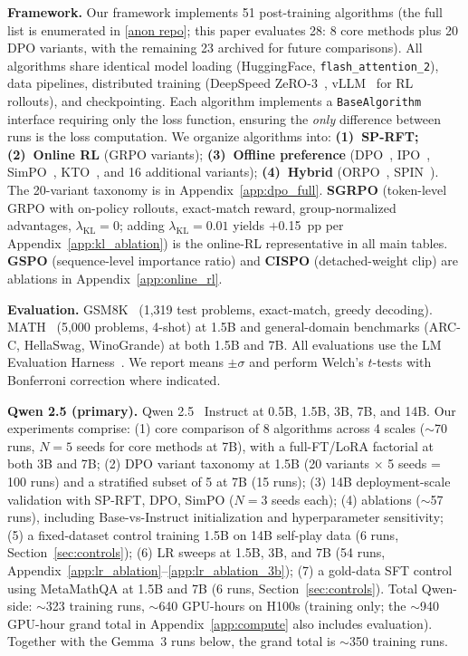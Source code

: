 \documentclass{article}
\newcommand{\sprft}{SP-RFT}
\begin{document}
\textbf{Framework.} Our framework implements 51 post-training algorithms (the full list is enumerated in [\href{https://github.com/anonymous/oxrl}{anon repo}]; this paper evaluates 28: 8 core methods plus 20 DPO variants, with the remaining 23 archived for future comparisons). All algorithms share identical model loading (HuggingFace, \texttt{flash\_attention\_2}), data pipelines, distributed training (DeepSpeed ZeRO-3~\citep{rajbhandari2020zero}, vLLM~\citep{kwon2023efficient} for RL rollouts), and checkpointing. Each algorithm implements a \texttt{BaseAlgorithm} interface requiring only the loss function, ensuring the \emph{only} difference between runs is the loss computation. We organize algorithms into: \textbf{(1)~\sprft{};} \textbf{(2)~Online RL} (GRPO variants); \textbf{(3)~Offline preference} (DPO~\citep{rafailov2023direct}, IPO~\citep{azar2024general}, SimPO~\citep{meng2024simpo}, KTO~\citep{ethayarajh2024kto}, and 16 additional variants); \textbf{(4)~Hybrid} (ORPO~\citep{hong2024orpo}, SPIN~\citep{chen2024spin}). The 20-variant taxonomy is in Appendix~\ref{app:dpo_full}. \textbf{SGRPO} (token-level GRPO with on-policy rollouts, exact-match reward, group-normalized advantages, $\lambda_\mathrm{KL}{=}0$; adding $\lambda_\mathrm{KL}{=}0.01$ yields $+$0.15~pp per Appendix~\ref{app:kl_ablation}) is the online-RL representative in all main tables. \textbf{GSPO} (sequence-level importance ratio) and \textbf{CISPO} (detached-weight clip) are ablations in Appendix~\ref{app:online_rl}.

\textbf{Evaluation.} GSM8K~\citep{cobbe2021gsm8k} (1,319 test problems, exact-match, greedy decoding). MATH~\citep{hendrycks2021math} (5,000 problems, 4-shot) at 1.5B and general-domain benchmarks (ARC-C, HellaSwag, WinoGrande) at both 1.5B and 7B. All evaluations use the LM Evaluation Harness~\citep{eval-harness}. We report means $\pm \sigma$ and perform Welch's $t$-tests with Bonferroni correction where indicated.

\label{sec:eval_protocol}
\label{sec:setup}

\textbf{Qwen 2.5 (primary).} Qwen 2.5~\citep{qwen2025qwen25} Instruct at 0.5B, 1.5B, 3B, 7B, and 14B. Our experiments comprise: (1) core comparison of 8 algorithms across 4 scales ($\sim$70 runs, $N{=}5$ seeds for core methods at 7B), with a full-FT/LoRA factorial at both 3B and 7B; (2) DPO variant taxonomy at 1.5B (20 variants $\times$ 5 seeds = 100 runs) and a stratified subset of 5 at 7B (15 runs); (3) 14B deployment-scale validation with \sprft{}, DPO, SimPO ($N{=}3$ seeds each); (4) ablations ($\sim$57 runs), including Base-vs-Instruct initialization and hyperparameter sensitivity; (5) a fixed-dataset control training 1.5B on 14B self-play data (6 runs, Section~\ref{sec:controls}); (6) LR sweeps at 1.5B, 3B, and 7B (54 runs, Appendix~\ref{app:lr_ablation}--\ref{app:lr_ablation_3b}); (7) a gold-data SFT control using MetaMathQA at 1.5B and 7B (6 runs, Section~\ref{sec:controls}). Total Qwen-side: $\sim$323 training runs, $\sim$640 GPU-hours on H100s (training only; the $\sim$940 GPU-hour grand total in Appendix~\ref{app:compute} also includes evaluation). Together with the Gemma~3 runs below, the grand total is $\sim$350 training runs.
\end{document}
